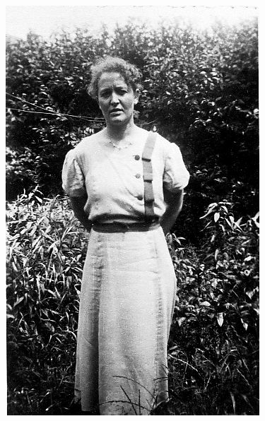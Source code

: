 \documentclass[10pt,twoside, openright]{memoir}
\begin{document}
\begin{figure}
\includegraphics[width=\textwidth]{img/29Moe}
\caption*{\footnotesize }
\end{figure}
\end{document}
